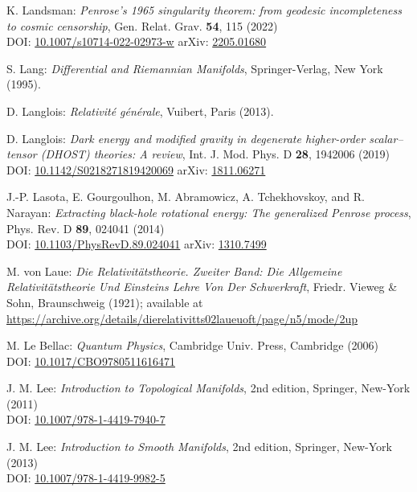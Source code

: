 \begin{thebibliography}{123}
K. Landsman:
{\em Penrose's 1965 singularity theorem: from geodesic incompleteness to cosmic censorship},
Gen. Relat. Grav. {\bf 54}, 115 (2022)\\
DOI: \href{https://doi.org/10.1007/s10714-022-02973-w}{10.1007/s10714-022-02973-w}\hfill
arXiv: \href{https://arxiv.org/abs/2205.01680}{2205.01680}

S. Lang:
{\em Differential and Riemannian Manifolds},
Springer-Verlag, New York (1995).

D. Langlois:
{\em Relativité générale},
Vuibert, Paris (2013).

D. Langlois:
{\em Dark energy and modified gravity in degenerate higher-order scalar–tensor (DHOST) theories: A review},
Int. J. Mod. Phys. D {\bf 28}, 1942006 (2019)\\
DOI: \href{https://doi.org/10.1142/S0218271819420069}{10.1142/S0218271819420069}\hfill
arXiv: \href{https://arxiv.org/abs/1811.06271}{1811.06271}

J.-P. Lasota, E. Gourgoulhon, M. Abramowicz, A. Tchekhovskoy,
and R. Narayan:
{\em Extracting black-hole rotational energy: The generalized Penrose process},
Phys. Rev. D {\bf 89}, 024041 (2014)  \\
DOI: \href{https://doi.org/10.1103/PhysRevD.89.024041}{10.1103/PhysRevD.89.024041}\hfill
arXiv: \href{https://arxiv.org/abs/1310.7499}{1310.7499}

M. von Laue: {\em Die Relativitätstheorie. Zweiter Band: Die Allgemeine Relativitätstheorie Und Einsteins Lehre Von Der Schwerkraft},
Friedr. Vieweg \& Sohn, Braunschweig (1921); available at \\
\url{https://archive.org/details/dierelativitts02laueuoft/page/n5/mode/2up}

M. Le Bellac:
{\em Quantum Physics},
Cambridge Univ. Press, Cambridge (2006)\\
DOI: \href{https://doi.org/10.1017/CBO9780511616471}{10.1017/CBO9780511616471}

J. M. Lee:
{\em Introduction to Topological Manifolds}, 2nd edition,
Springer, New-York (2011)\\
DOI: \href{https://doi.org/10.1007/978-1-4419-7940-7}{10.1007/978-1-4419-7940-7}

J. M. Lee:
{\em Introduction to Smooth Manifolds}, 2nd edition,
Springer, New-York (2013)\\
DOI: \href{https://doi.org/10.1007/978-1-4419-9982-5}{10.1007/978-1-4419-9982-5}


\end{thebibliography}
